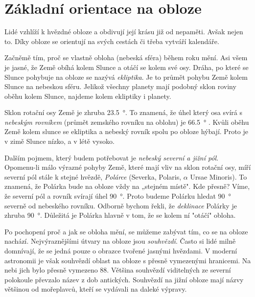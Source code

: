 \documentclass[crop=false]{standalone}
\begin{document}
\section*{Základní orientace na obloze}

\quad

Lidé vzhlíží k hvězdné obloze a obdivují její krásu již od nepaměti.
Avšak nejen to.
Díky obloze se orientují na svých cestách či třeba vytváří kalendáře.

Začněmě tím, proč se vlastně obloha (nebeská sféra) během roku mění.
Asi všem je jasné, že Země obíhá kolem Slunce a otáčí se kolem své osy.
Dráha, po které se Slunce pohybuje na obloze se nazývá \textit{ekliptika}. Je to průmět pohybu Země kolem Slunce na nebeskou sféru.
Jelikož všechny planety mají podobný sklon roviny oběhu kolem Slunce, najdeme kolem ekliptiky i planety.

Sklon rotační osy Země je zhruba \qty{23,5}{\degree}.
To znamená, že úhel který osa svírá s \textit{nebeským rovníkem} (průmět zemského rovníku na oblohu) je \qty{66,5}{\degree} . 
Kvůli oběhu Země kolem slunce se ekliptika a nebeský rovník spolu po obloze hýbají.
Proto je v zimě Slunce nízko, a v létě vysoko.

Dalším pojmem, který budem potřebovat je \textit{nebeský severní a jižní pól}.
Opomenu-li málo výrazné pohyby Země, které mají vliv na sklon rotační osy, míří severní pól stále k stejné hvězdě, \textit{Polárce} (Severka, Polaris, $\alpha$ Ursae Minoris).
To znamená, že Polárka bude na obloze vždy na „stejném místě".
Kde přesně?
Víme, že severní pól a rovník svírají úhel \qty{90}{\degree}. Proto budeme Polárku hledat \qty{90}{\degree} severně od nebeského rovníku. 
Odborně bychom řekli, že \textit{deklinace} Polárky je zhruba \qty{90}{\degree}.
Důležitá je Polárka hlavně v tom, že se kolem ní "otáčí" obloha. 

Po pochopení proč a jak se obloha mění, se můžeme zabývat tím, co se na obloze nachází.
Nejvýraznějšími útvary na obloze jsou \textit{souhvězdí}.
Často si lidé milně domnívají, že se jedná pouze o obrazce tvořené jasnými hvězdami.
V moderní astronomii je však souhvězdí oblast na obloze s přesně vymezenými hranicemi.
Na nebi jich bylo přesně vymezeno 88. Většina souhvězdí  viditelných ze  severní polokoule převzalo název z dob antických.
Souhvězdí na jižní obloze mají názvy většinou od mořeplavců, kteří se vydávali na daleké výpravy.
\end{document}
